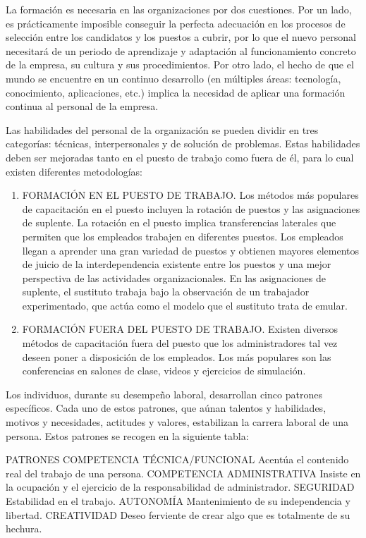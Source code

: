 \documentclass[
]{krantz}
\providecommand{\tightlist}{%
  \setlength{\itemsep}{0pt}\setlength{\parskip}{0pt}}
\begin{document}
La formación es necesaria en las organizaciones por dos cuestiones. Por un lado, es prácticamente imposible conseguir la perfecta adecuación en los procesos de selección entre los candidatos y los puestos a cubrir, por lo que el nuevo personal necesitará de un periodo de aprendizaje y adaptación al funcionamiento concreto de la empresa, su cultura y sus procedimientos. Por otro lado, el hecho de que el mundo se encuentre en un continuo desarrollo (en múltiples áreas: tecnología, conocimiento, aplicaciones, etc.) implica la necesidad de aplicar una formación continua al personal de la empresa.

Las habilidades del personal de la organización se pueden dividir en tres categorías: técnicas, interpersonales y de solución de problemas. Estas habilidades deben ser mejoradas tanto en el puesto de trabajo como fuera de él, para lo cual existen diferentes metodologías:

\begin{enumerate}
\def\labelenumi{\arabic{enumi}.}
\tightlist
\item
  FORMACIÓN EN EL PUESTO DE TRABAJO. Los métodos más populares de capacitación en el puesto incluyen la rotación de puestos y las asignaciones de suplente. La rotación en el puesto implica transferencias laterales que permiten que los empleados trabajen en diferentes puestos. Los empleados llegan a aprender una gran variedad de puestos y obtienen mayores elementos de juicio de la interdependencia existente entre los puestos y una mejor perspectiva de las actividades organizacionales. En las asignaciones de suplente, el sustituto trabaja bajo la observación de un trabajador experimentado, que actúa como el modelo que el sustituto trata de emular.
\item
  FORMACIÓN FUERA DEL PUESTO DE TRABAJO. Existen diversos métodos de capacitación fuera del puesto que los administradores tal vez deseen poner a disposición de los empleados. Los más populares son las conferencias en salones de clase, videos y ejercicios de simulación.
\end{enumerate}

Los individuos, durante su desempeño laboral, desarrollan cinco patrones específicos. Cada uno de estos patrones, que aúnan talentos y habilidades, motivos y necesidades, actitudes y valores, estabilizan la carrera laboral de una persona. Estos patrones se recogen en la siguiente tabla:

PATRONES
COMPETENCIA TÉCNICA/FUNCIONAL Acentúa el contenido real del trabajo de una persona.
COMPETENCIA ADMINISTRATIVA Insiste en la ocupación y el ejercicio de la responsabilidad de administrador.
SEGURIDAD Estabilidad en el trabajo.
AUTONOMÍA Mantenimiento de su independencia y libertad.
CREATIVIDAD Deseo ferviente de crear algo que es totalmente de su hechura.
\end{document}
